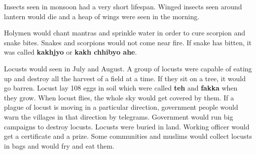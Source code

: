 Insects seen in monsoon had a very short lifespan. Winged insects seen around
lantern would die and a heap of wings were seen in the morning. 

Holymen would chant mantras and sprinkle water in order to cure scorpion and
snake bites. Snakes and scorpions would not come near fire. If snake has
bitten, it was called \textbf{kakhjyo} or \textbf{kakh chhibyo ahe}.

Locusts would seen in July and August. A group of locusts were capable of
eating up and destroy all the harvest of a field at a time. If they sit on a
tree, it would go barren. Locust lay 108 eggs in soil which were called
\textbf{teh} and \textbf{fakka} when they grow. When locust flies, the whole
sky would get covered by them. If a plague of locust is moving in a particular
direction, government people would warn the villages in that direction by
telegrams. Government would run big campaigns to destroy locusts. Locusts were
buried in land. Working officer would get a certificate and a prize. Some
communities and muslims would collect locusts in bags and would fry and eat
them.

